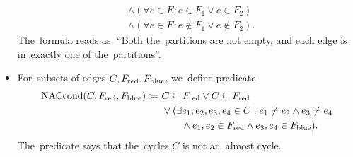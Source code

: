 \begin{itemize}
\begin{align*}
		       & \land (\forall e \in E : e \in F_1 \lor e \in F_2 )          \\
		       & \land (\forall e \in E : e \not\in F_1 \lor e \not\in F_2 ).
	      \end{align*}
	      The~formula reads as: ``Both the~partitions are not empty,
	      and each edge is in~exactly one of the~partitions''.
	\item For~subsets of edges \( C, F_{\text{red}}, F_{\text{blue}} \), we~define predicate
	      \begin{align*}
		      \text{NACcond}(C, F_{\text{red}}, F_{\text{blue}}) \coloneqq \ 
		       & C \subseteq F_{\text{red}} \lor C \subseteq F_{\text{red}}
		      \\
		       & \lor (\exists e_1, e_2, e_3, e_4 \in C :
		      e_1 \ne e_2 \land e_3 \ne e_4
		      \\
		       & \qquad \land e_1, e_2 \in F_{\text{red}} \land e_3, e_4 \in F_{\text{blue}} ).
	      \end{align*}
	      The~predicate says that the~cycles \( C \) is not an~almost cycle.
\end{itemize}
%

